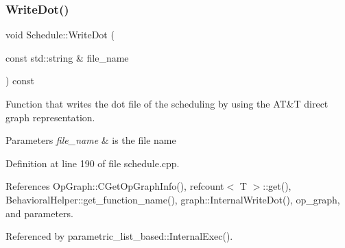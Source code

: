\subsubsection{\texorpdfstring{Write\+Dot()}{WriteDot()}}
{\footnotesize\ttfamily void Schedule\+::\+Write\+Dot (\begin{DoxyParamCaption}\item[{const std\+::string \&}]{file\+\_\+name }\end{DoxyParamCaption}) const}



Function that writes the dot file of the scheduling by using the AT\&T direct graph representation. 


\begin{DoxyParams}{Parameters}
{\em file\+\_\+name} & is the file name \\
\hline
\end{DoxyParams}


Definition at line 190 of file schedule.\+cpp.



References Op\+Graph\+::\+C\+Get\+Op\+Graph\+Info(), refcount$<$ T $>$\+::get(), Behavioral\+Helper\+::get\+\_\+function\+\_\+name(), graph\+::\+Internal\+Write\+Dot(), op\+\_\+graph, and parameters.



Referenced by parametric\+\_\+list\+\_\+based\+::\+Internal\+Exec().

